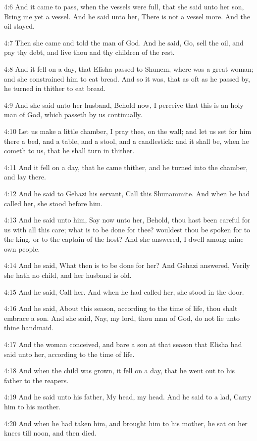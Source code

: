 4:6 And it came to pass, when the vessels were full, that she said unto her son, Bring me yet a vessel. And he said unto her, There is not a vessel more. And the oil stayed.

4:7 Then she came and told the man of God. And he said, Go, sell the oil, and pay thy debt, and live thou and thy children of the rest.

4:8 And it fell on a day, that Elisha passed to Shunem, where was a great woman; and she constrained him to eat bread. And so it was, that as oft as he passed by, he turned in thither to eat bread.

4:9 And she said unto her husband, Behold now, I perceive that this is an holy man of God, which passeth by us continually.

4:10 Let us make a little chamber, I pray thee, on the wall; and let us set for him there a bed, and a table, and a stool, and a candlestick: and it shall be, when he cometh to us, that he shall turn in thither.

4:11 And it fell on a day, that he came thither, and he turned into the chamber, and lay there.

4:12 And he said to Gehazi his servant, Call this Shunammite. And when he had called her, she stood before him.

4:13 And he said unto him, Say now unto her, Behold, thou hast been careful for us with all this care; what is to be done for thee?  wouldest thou be spoken for to the king, or to the captain of the host? And she answered, I dwell among mine own people.

4:14 And he said, What then is to be done for her? And Gehazi answered, Verily she hath no child, and her husband is old.

4:15 And he said, Call her. And when he had called her, she stood in the door.

4:16 And he said, About this season, according to the time of life, thou shalt embrace a son. And she said, Nay, my lord, thou man of God, do not lie unto thine handmaid.

4:17 And the woman conceived, and bare a son at that season that Elisha had said unto her, according to the time of life.

4:18 And when the child was grown, it fell on a day, that he went out to his father to the reapers.

4:19 And he said unto his father, My head, my head. And he said to a lad, Carry him to his mother.

4:20 And when he had taken him, and brought him to his mother, he sat on her knees till noon, and then died.

